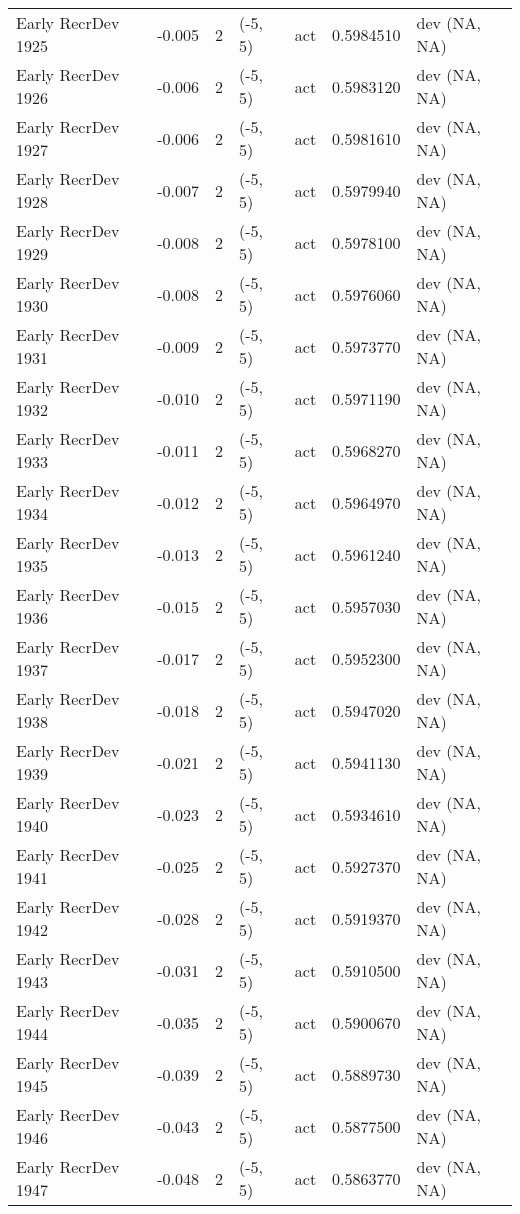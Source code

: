 \documentclass[11pt,
  english,
  letterpaper,
]{article}
\begin{document}
\begin{landscape}
\begin{longtable}[t]{>{\raggedright\arraybackslash}p{7cm}lllll>{\raggedright\arraybackslash}p{4cm}}
Early RecrDev 1925 & -0.005 & 2 & (-5, 5) & act & 0.5984510 & dev (NA, NA)\\
Early RecrDev 1926 & -0.006 & 2 & (-5, 5) & act & 0.5983120 & dev (NA, NA)\\
Early RecrDev 1927 & -0.006 & 2 & (-5, 5) & act & 0.5981610 & dev (NA, NA)\\
Early RecrDev 1928 & -0.007 & 2 & (-5, 5) & act & 0.5979940 & dev (NA, NA)\\
Early RecrDev 1929 & -0.008 & 2 & (-5, 5) & act & 0.5978100 & dev (NA, NA)\\
Early RecrDev 1930 & -0.008 & 2 & (-5, 5) & act & 0.5976060 & dev (NA, NA)\\
Early RecrDev 1931 & -0.009 & 2 & (-5, 5) & act & 0.5973770 & dev (NA, NA)\\
Early RecrDev 1932 & -0.010 & 2 & (-5, 5) & act & 0.5971190 & dev (NA, NA)\\
Early RecrDev 1933 & -0.011 & 2 & (-5, 5) & act & 0.5968270 & dev (NA, NA)\\
Early RecrDev 1934 & -0.012 & 2 & (-5, 5) & act & 0.5964970 & dev (NA, NA)\\
Early RecrDev 1935 & -0.013 & 2 & (-5, 5) & act & 0.5961240 & dev (NA, NA)\\
Early RecrDev 1936 & -0.015 & 2 & (-5, 5) & act & 0.5957030 & dev (NA, NA)\\
Early RecrDev 1937 & -0.017 & 2 & (-5, 5) & act & 0.5952300 & dev (NA, NA)\\
Early RecrDev 1938 & -0.018 & 2 & (-5, 5) & act & 0.5947020 & dev (NA, NA)\\
Early RecrDev 1939 & -0.021 & 2 & (-5, 5) & act & 0.5941130 & dev (NA, NA)\\
Early RecrDev 1940 & -0.023 & 2 & (-5, 5) & act & 0.5934610 & dev (NA, NA)\\
Early RecrDev 1941 & -0.025 & 2 & (-5, 5) & act & 0.5927370 & dev (NA, NA)\\
Early RecrDev 1942 & -0.028 & 2 & (-5, 5) & act & 0.5919370 & dev (NA, NA)\\
Early RecrDev 1943 & -0.031 & 2 & (-5, 5) & act & 0.5910500 & dev (NA, NA)\\
Early RecrDev 1944 & -0.035 & 2 & (-5, 5) & act & 0.5900670 & dev (NA, NA)\\
Early RecrDev 1945 & -0.039 & 2 & (-5, 5) & act & 0.5889730 & dev (NA, NA)\\
Early RecrDev 1946 & -0.043 & 2 & (-5, 5) & act & 0.5877500 & dev (NA, NA)\\
Early RecrDev 1947 & -0.048 & 2 & (-5, 5) & act & 0.5863770 & dev (NA, NA)\\

\end{longtable}
\end{landscape}
\end{document}
